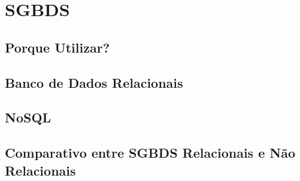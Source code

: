 \chapter{SGBDS}
\thispagestyle{empty}

\section{Porque Utilizar?}

\section{Banco de Dados Relacionais}

\section{NoSQL}

\section{Comparativo entre SGBDS Relacionais e Não Relacionais}